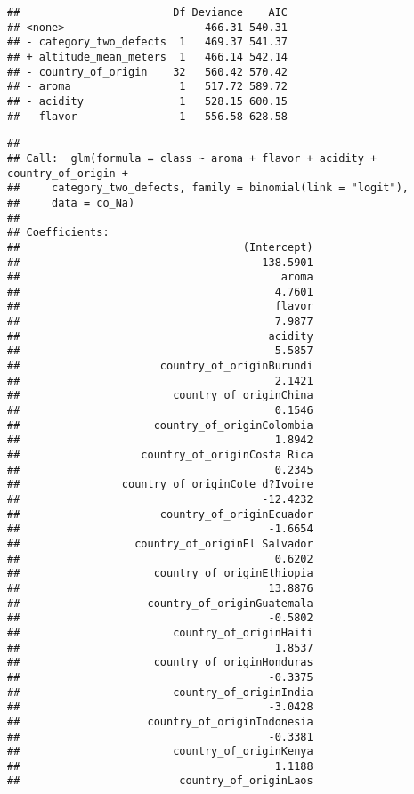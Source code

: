 \documentclass[
]{article}
\begin{document}
\begin{verbatim}
##                        Df Deviance    AIC
## <none>                      466.31 540.31
## - category_two_defects  1   469.37 541.37
## + altitude_mean_meters  1   466.14 542.14
## - country_of_origin    32   560.42 570.42
## - aroma                 1   517.72 589.72
## - acidity               1   528.15 600.15
## - flavor                1   556.58 628.58
\end{verbatim}

\begin{verbatim}
## 
## Call:  glm(formula = class ~ aroma + flavor + acidity + country_of_origin + 
##     category_two_defects, family = binomial(link = "logit"), 
##     data = co_Na)
## 
## Coefficients:
##                                   (Intercept)  
##                                     -138.5901  
##                                         aroma  
##                                        4.7601  
##                                        flavor  
##                                        7.9877  
##                                       acidity  
##                                        5.5857  
##                      country_of_originBurundi  
##                                        2.1421  
##                        country_of_originChina  
##                                        0.1546  
##                     country_of_originColombia  
##                                        1.8942  
##                   country_of_originCosta Rica  
##                                        0.2345  
##                country_of_originCote d?Ivoire  
##                                      -12.4232  
##                      country_of_originEcuador  
##                                       -1.6654  
##                  country_of_originEl Salvador  
##                                        0.6202  
##                     country_of_originEthiopia  
##                                       13.8876  
##                    country_of_originGuatemala  
##                                       -0.5802  
##                        country_of_originHaiti  
##                                        1.8537  
##                     country_of_originHonduras  
##                                       -0.3375  
##                        country_of_originIndia  
##                                       -3.0428  
##                    country_of_originIndonesia  
##                                       -0.3381  
##                        country_of_originKenya  
##                                        1.1188  
##                         country_of_originLaos  

\end{verbatim}
\end{document}
